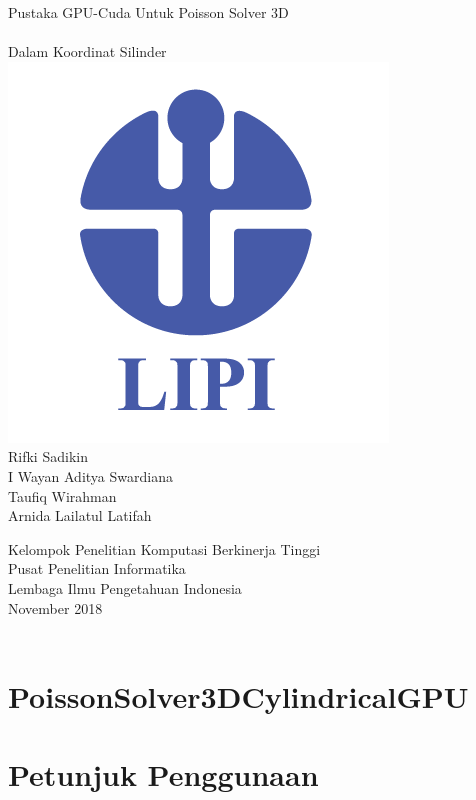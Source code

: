 \documentclass[twoside]{book}
\newcommand{\+}{\discretionary{\mbox{\scriptsize$\hookleftarrow$}}{}{}}
\newcommand{\clearemptydoublepage}{%
  \newpage{\pagestyle{empty}\cleardoublepage}%
}
\begin{document}
\hypersetup{pageanchor=false,
             bookmarksnumbered=true,
             pdfencoding=unicode
            }
\begin{titlepage}

\begin{center}%
\vspace*{2cm}
{\Huge Pustaka G\+P\+U-\/\+Cuda Untuk Poisson Solver 3D \\ \ \\Dalam Koordinat Silinder } \\
\vspace*{2cm}
{\includegraphics[width=0.2\linewidth]{Logo_LIPI-01.png}} \\
\vspace*{2cm}
{\Large Rifki Sadikin \\ 
        I Wayan Aditya Swardiana \\
        Taufiq Wirahman \\
        Arnida Lailatul Latifah}
   
\vspace*{3cm}
{\Large Kelompok Penelitian Komputasi Berkinerja Tinggi \\
Pusat Penelitian Informatika \\
Lembaga Ilmu Pengetahuan Indonesia \\
November 2018 \\}
\vspace*{1cm}
\vspace*{1cm}
\\
\end{center}
\end{titlepage}
\clearemptydoublepage
{}
\tableofcontents
\clearemptydoublepage
{}
\hypersetup{pageanchor=true}

\chapter{Poisson\+Solver3\+D\+Cylindrical\+G\+PU}
\label{index}\hypertarget{index}{}
\chapter{Petunjuk Penggunaan}
\label{md__home_nfs_aswardiana_Workspace_mp-headnode_lipi_PoissonSolver3D_PETUNJUKPENGGUNAAN}
\hypertarget{md__home_nfs_aswardiana_Workspace_mp-headnode_lipi_PoissonSolver3D_PETUNJUKPENGGUNAAN}{}

\end{document}
